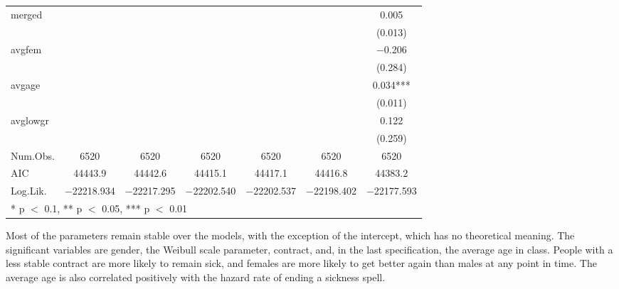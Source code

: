 \documentclass[
]{article}
\begin{document}
\begin{table}[!h]
{\begin{tabular}[t]{lcccccc}
merged &  &  &  &  &  & \num{0.005}\\
 &  &  &  &  &  & (\num{0.013})\\
avgfem &  &  &  &  &  & \num{-0.206}\\
 &  &  &  &  &  & (\num{0.284})\\
avgage &  &  &  &  &  & \num{0.034}***\\
 &  &  &  &  &  & (\num{0.011})\\
avglowgr &  &  &  &  &  & \num{0.122}\\
 &  &  &  &  &  & (\num{0.259})\\
\midrule
Num.Obs. & \num{6520} & \num{6520} & \num{6520} & \num{6520} & \num{6520} & \num{6520}\\
AIC & \num{44443.9} & \num{44442.6} & \num{44415.1} & \num{44417.1} & \num{44416.8} & \num{44383.2}\\
Log.Lik. & \num{-22218.934} & \num{-22217.295} & \num{-22202.540} & \num{-22202.537} & \num{-22198.402} & \num{-22177.593}\\
\bottomrule
\multicolumn{7}{l}{\rule{0pt}{1em}* p $<$ 0.1, ** p $<$ 0.05, *** p $<$ 0.01}\\
\end{tabular}}
\end{table}

Most of the parameters remain stable over the models, with the exception
of the intercept, which has no theoretical meaning. The significant
variables are gender, the Weibull scale parameter, contract, and, in the
last specification, the average age in class. People with a less stable
contract are more likely to remain sick, and females are more likely to
get better again than males at any point in time. The average age is
also correlated positively with the hazard rate of ending a sickness
spell. \clearpage
\end{document}
